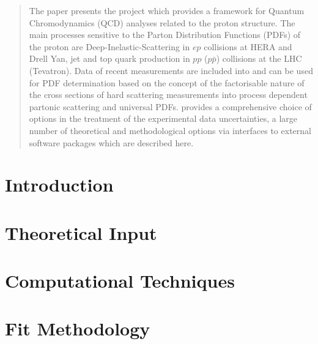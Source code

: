 \setcounter{tocdepth}{4}
\maketitle

\begin{abstract}
The paper presents the \fitter project
which provides a framework for Quantum Chromodynamics (QCD) analyses related 
to the proton structure.
The main processes sensitive to the Parton Distribution Functions (PDFs) 
of the proton are Deep-Inelastic-Scattering  
in $ep$ collisions at HERA and Drell Yan, jet and top quark production in 
$pp$ ($p\bar{p}$) collisions at the LHC (Tevatron).
Data of recent measurements are included into \fitter and can 
be used for PDF determination
 based on the concept of the factorisable nature 
of the cross sections of hard scattering measurements into process dependent 
partonic scattering and universal PDFs.
\fitter provides a comprehensive choice of options in the treatment of the experimental 
data uncertainties, a large number of theoretical and methodological options 
via interfaces to external software packages which are described here.

\end{abstract}
   

\tableofcontents
            

\section{Introduction}
\label{sec:intro}


\section{Theoretical Input}
\label{sec:theory}

%
\section{Computational Techniques}
\label{sec:techniques}


\section{Fit Methodology}
\label{sec:method}


